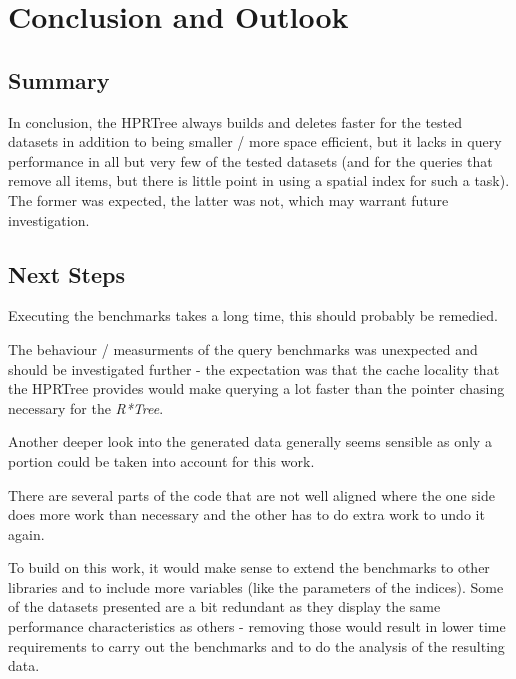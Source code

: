 
\chapter{Conclusion and Outlook}
\label{chap:conc}
\section{Summary}


In conclusion, the \acs{HPRTree} always builds and deletes faster for the tested datasets in addition to being smaller / more space efficient, but it lacks in query performance in all but very few of the tested datasets (and for the queries that remove all items, but there is little point in using a spatial index for such a task). The former was expected, the latter was not, which may warrant future investigation.

\section{Next Steps} 

Executing the benchmarks takes a long time, this should probably be remedied.

The behaviour / measurments of the query benchmarks was unexpected and should be investigated further - the expectation was that the cache locality that the \acs{HPRTree} provides would make querying a lot faster than the pointer chasing necessary for the \textit{R*Tree}.

Another deeper look into the generated data generally seems sensible as only a portion could be taken into account for this work.

There are several parts of the code that are not well aligned where the one side does more work than necessary and the other has to do extra work to undo it again.

To build on this work, it would make sense to extend the benchmarks to other libraries and to include more variables (like the parameters of the indices). Some of the datasets presented are a bit redundant as they display the same performance characteristics as others - removing those would result in lower time requirements to carry out the benchmarks and to do the analysis of the resulting data.